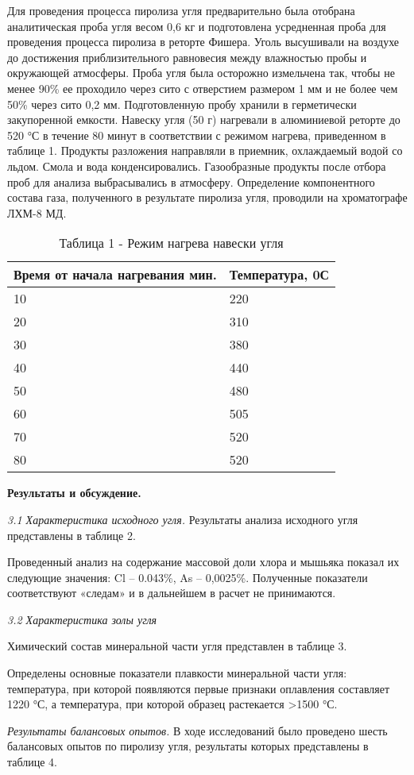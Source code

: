 \begin{multicols}{2}
Для проведения процесса пиролиза угля предварительно была отобрана
аналитическая проба угля весом 0,6 кг и подготовлена усредненная проба
для проведения процесса пиролиза в реторте Фишера. Уголь высушивали на
воздухе до достижения приблизительного равновесия между влажностью пробы
и окружающей атмосферы. Проба угля была осторожно измельчена так, чтобы
не менее 90\% ее проходило через сито с отверстием размером 1 мм и не
более чем 50\% через сито 0,2 мм. Подготовленную пробу хранили в
герметически закупоренной емкости. Навеску угля (50 г) нагревали в
алюминиевой реторте до 520 °С в течение 80 минут в соответствии с
режимом нагрева, приведенном в таблице 1. Продукты разложения направляли
в приемник, охлаждаемый водой со льдом. Смола и вода конденсировались.
Газообразные продукты после отбора проб для анализа выбрасывались в
атмосферу. Определение компонентного состава газа, полученного в
результате пиролиза угля, проводили на хроматографе ЛХМ-8 МД.

\begin{table}[H]
\caption*{Таблица 1 - Режим нагрева навески угля}
\centering
\begin{tabular}{|p{}|p{}|}
\hline
Время от начала нагревания мин. & Температура, 0С \\ \hline
10 & 220 \\ \hline
20 & 310 \\ \hline
30 & 380 \\ \hline
40 & 440 \\ \hline
50 & 480 \\ \hline
60 & 505 \\ \hline
70 & 520 \\ \hline
80 & 520 \\ \hline
\end{tabular}
\end{table}

{\bfseries Результаты и обсуждение.}

\emph{3.1 Характеристика исходного угля.} Результаты анализа исходного
угля представлены в таблице 2.

Проведенный анализ на содержание массовой доли хлора и мышьяка показал
их следующие значения: Cl -- 0.043\%, As -- 0,0025\%. Полученные
показатели соответствуют «следам» и в дальнейшем в расчет не
принимаются.

\emph{3.2 Характеристика золы угля}

Химический состав минеральной части угля представлен в таблице 3.

Определены основные показатели плавкости минеральной части угля:
температура, при которой появляются первые признаки оплавления
составляет 1220 °С, а температура, при которой образец растекается
\textgreater1500 °С.

\emph{Результаты балансовых опытов.} В ходе исследований было проведено
шесть балансовых опытов по пиролизу угля, результаты которых
представлены в таблице 4.
\end{multicols}


